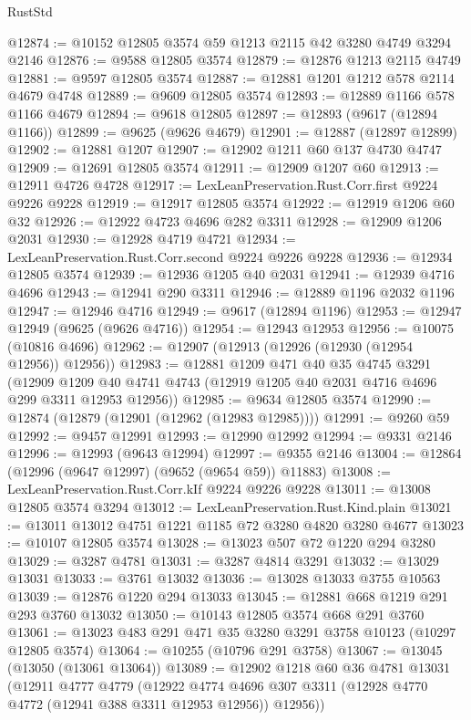 \begin{lexlean}{RustStd}
\begin{coremodule}
@12874 := @10152 @12805 @3574 @59 @1213 @2115 @42 @3280 @4749 @3294 @2146
@12876 := @9588 @12805 @3574
@12879 := @12876 @1213 @2115 @4749
@12881 := @9597 @12805 @3574
@12887 := @12881 @1201 @1212 @578 @2114 @4679 @4748
@12889 := @9609 @12805 @3574
@12893 := @12889 @1166 @578 @1166 @4679
@12894 := @9618 @12805
@12897 := @12893 (@9617 (@12894 @1166))
@12899 := @9625 (@9626 @4679)
@12901 := @12887 (@12897 @12899)
@12902 := @12881 @1207
@12907 := @12902 @1211 @60 @137 @4730 @4747
@12909 := @12691 @12805 @3574
@12911 := @12909 @1207 @60
@12913 := @12911 @4726 @4728
@12917 := LexLeanPreservation.Rust.Corr.first @9224 @9226 @9228
@12919 := @12917 @12805 @3574
@12922 := @12919 @1206 @60 @32
@12926 := @12922 @4723 @4696 @282 @3311
@12928 := @12909 @1206 @2031
@12930 := @12928 @4719 @4721
@12934 := LexLeanPreservation.Rust.Corr.second @9224 @9226 @9228
@12936 := @12934 @12805 @3574
@12939 := @12936 @1205 @40 @2031
@12941 := @12939 @4716 @4696
@12943 := @12941 @290 @3311
@12946 := @12889 @1196 @2032 @1196
@12947 := @12946 @4716
@12949 := @9617 (@12894 @1196)
@12953 := @12947 @12949 (@9625 (@9626 @4716))
@12954 := @12943 @12953
@12956 := @10075 (@10816 @4696)
@12962 := @12907 (@12913 (@12926 (@12930 (@12954 @12956)) @12956))
@12983 := @12881
    @1209
    @471
    @40
    @35
    @4745
    @3291
    (@12909 @1209 @40 @4741 @4743 (@12919 @1205 @40 @2031 @4716 @4696 @299 @3311 @12953 @12956))
@12985 := @9634 @12805 @3574
@12990 := @12874 (@12879 (@12901 (@12962 (@12983 @12985))))
@12991 := @9260 @59
@12992 := @9457 @12991
@12993 := @12990 @12992
@12994 := @9331 @2146
@12996 := @12993 (@9643 @12994)
@12997 := @9355 @2146
@13004 := @12864 (@12996 (@9647 @12997) (@9652 (@9654 @59)) @11883)
@13008 := LexLeanPreservation.Rust.Corr.kIf @9224 @9226 @9228
@13011 := @13008 @12805 @3574 @3294
@13012 := LexLeanPreservation.Rust.Kind.plain
@13021 := @13011 @13012 @4751 @1221 @1185 @72 @3280 @4820 @3280 @4677
@13023 := @10107 @12805 @3574
@13028 := @13023 @507 @72 @1220 @294 @3280
@13029 := @3287 @4781
@13031 := @3287 @4814 @3291
@13032 := @13029 @13031
@13033 := @3761 @13032
@13036 := @13028 @13033 @3755 @10563
@13039 := @12876 @1220 @294 @13033
@13045 := @12881 @668 @1219 @291 @293 @3760 @13032
@13050 := @10143 @12805 @3574 @668 @291 @3760
@13061 := @13023 @483 @291 @471 @35 @3280 @3291 @3758 @10123 (@10297 @12805 @3574)
@13064 := @10255 (@10796 @291 @3758)
@13067 := @13045 (@13050 (@13061 @13064))
@13089 := @12902
    @1218
    @60
    @36
    @4781
    @13031
    (@12911
      @4777
      @4779
      (@12922 @4774 @4696 @307 @3311 (@12928 @4770 @4772 (@12941 @388 @3311 @12953 @12956)) @12956))

\end{coremodule}
\end{lexlean}
